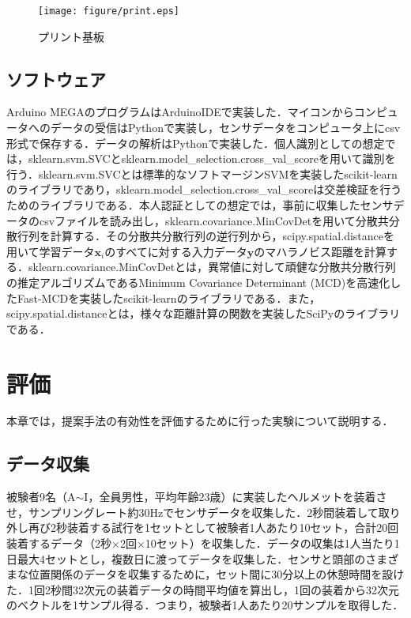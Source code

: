 \documentclass[Japanese,noauthor]{dicomopapers}
\begin{document}
\begin{figure}[!t]
  \begin{center}
    \texttt{[image: figure/print.eps]}
  \end{center}
  \caption{プリント基板}
  \label{print}
\end{figure}

\subsection{ソフトウェア}
Arduino MEGAのプログラムはArduinoIDEで実装した．マイコンからコンピュータへのデータの受信はPythonで実装し，センサデータをコンピュータ上にcsv形式で保存する．データの解析はPythonで実装した．個人識別としての想定では，sklearn.svm.SVCとsklearn.model\_selection.cross\_val\_scoreを用いて識別を行う．sklearn.svm.SVCとは標準的なソフトマージンSVMを実装したscikit-learnのライブラリであり，sklearn.model\_selection.cross\_val\_scoreは交差検証を行うためのライブラリである．本人認証としての想定では，事前に収集したセンサデータのcsvファイルを読み出し，sklearn.covariance.MinCovDetを用いて分散共分散行列を計算する．その分散共分散行列の逆行列から，scipy.spatial.distanceを用いて学習データ$\bm{x}_i$のすべてに対する入力データ$\bm{y}$のマハラノビス距離を計算する．sklearn.covariance.MinCovDetとは，異常値に対して頑健な分散共分散行列の推定アルゴリズムであるMinimum Covariance Determinant (MCD)を高速化したFast-MCD\cite{fast_mcd}を実装したscikit-learnのライブラリである．また，scipy.spatial.distanceとは，様々な距離計算の関数を実装したSciPyのライブラリである．

\section{評価}
\label{evaluation}
本章では，提案手法の有効性を評価するために行った実験について説明する．

\subsection{データ収集}
被験者9名（A$\sim$I，全員男性，平均年齢23歳）に実装したヘルメットを装着させ，サンプリングレート約30Hzでセンサデータを収集した．2秒間装着して取り外し再び2秒装着する試行を1セットとして被験者1人あたり10セット，合計20回装着するデータ（2秒$\times$2回$\times$10セット）を収集した．データの収集は1人当たり1日最大4セットとし，複数日に渡ってデータを収集した．センサと頭部のさまざまな位置関係のデータを収集するために，セット間に30分以上の休憩時間を設けた．1回2秒間32次元の装着データの時間平均値を算出し，1回の装着から32次元のベクトルを1サンプル得る．つまり，被験者1人あたり20サンプルを取得した．
\end{document}
